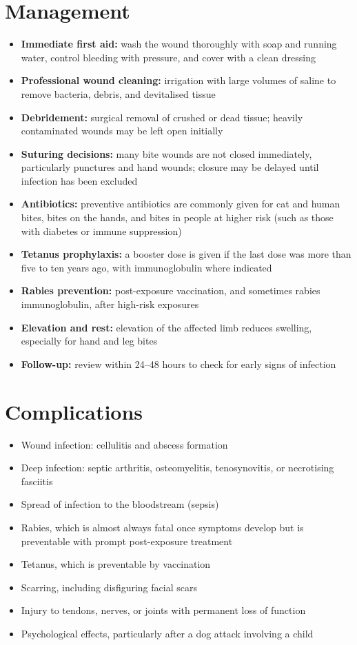 \section*{Management}
\begin{itemize}
    \item \textbf{Immediate first aid:} wash the wound thoroughly with soap and running water, control bleeding with pressure, and cover with a clean dressing
    \item \textbf{Professional wound cleaning:} irrigation with large volumes of saline to remove bacteria, debris, and devitalised tissue
    \item \textbf{Debridement:} surgical removal of crushed or dead tissue; heavily contaminated wounds may be left open initially
    \item \textbf{Suturing decisions:} many bite wounds are not closed immediately, particularly punctures and hand wounds; closure may be delayed until infection has been excluded
    \item \textbf{Antibiotics:} preventive antibiotics are commonly given for cat and human bites, bites on the hands, and bites in people at higher risk (such as those with diabetes or immune suppression)
    \item \textbf{Tetanus prophylaxis:} a booster dose is given if the last dose was more than five to ten years ago, with immunoglobulin where indicated
    \item \textbf{Rabies prevention:} post-exposure vaccination, and sometimes rabies immunoglobulin, after high-risk exposures
    \item \textbf{Elevation and rest:} elevation of the affected limb reduces swelling, especially for hand and leg bites
    \item \textbf{Follow-up:} review within 24--48 hours to check for early signs of infection
\end{itemize}

\section*{Complications}
\begin{itemize}
    \item Wound infection: cellulitis and abscess formation
    \item Deep infection: septic arthritis, osteomyelitis, tenosynovitis, or necrotising fasciitis
    \item Spread of infection to the bloodstream (sepsis)
    \item Rabies, which is almost always fatal once symptoms develop but is preventable with prompt post-exposure treatment
    \item Tetanus, which is preventable by vaccination
    \item Scarring, including disfiguring facial scars
    \item Injury to tendons, nerves, or joints with permanent loss of function
    \item Psychological effects, particularly after a dog attack involving a child
\end{itemize}

